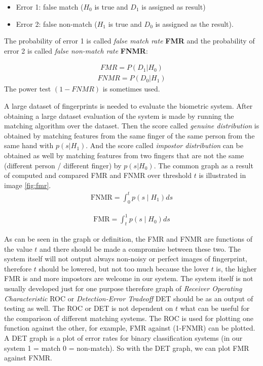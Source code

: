 \begin{itemize}[label={}]
    \item Error 1: false match ($H_0$ is true and $D_1$ is assigned as result)
    \item Error 2: false non-match ($H_1$ is true and $D_0$ is assigned as the result).
\end{itemize}

The probability of error 1 is called \emph{false match rate} \textbf{FMR} and the probability  of error 2 is called \emph{false non-match rate} \textbf{FNMR}:\cite{maltoni2009handbook}

\begin{align}
    FMR = P(D_1 | H_0 )
\end{align}
\begin{align}
    FNMR = P(D_0 | H_1 )
\end{align}
The power test $(1 - FNMR)$ is sometimes used.\cite{maltoni2009handbook}

A large dataset of fingerprints is needed to evaluate the biometric system. After obtaining a large dataset evaluation of the system is made by running the matching algorithm over the dataset. Then the score called \emph{genuine distribution} is obtained by matching features from the same finger of the same person from the same hand with  $p (s | H_1)$. And the score called \emph{impostor distribution} can be obtained as well by matching features from two fingers that are not the same (different person / different finger) by $p (s | H_0)$. The common graph as a result of computed and compared FMR and FNMR over threshold $t$ is illustrated in image \ref{fig:fmr}. 
\begin{align}
    \mathrm{FNMR}=\int_{0}^{t} p\left(s \mid H_{1}\right) ds
\end{align}
    
\begin{align}
    \mathrm{FMR}=\int_{t}^{1} p\left(s \mid H_{0}\right) ds
\end{align}

As can be seen in the graph or definition, the FMR and FNMR are functions of the value $t$ and there should be made a compromise between these two. The system itself will not output always non-noisy or perfect images of fingerprint, therefore $t$ should be lowered, but not too much because the lover $t$ is, the higher FMR is and more impostors are welcome in our system. The system itself is not usually developed just for one purpose therefore graph of \emph{Receiver Operating Characteristic} ROC or \emph{Detection-Error Tradeoff} DET should be as an output of testing as well. The ROC or DET is not dependent on $t$ what can be useful for the comparison of different matching systems. The ROC is used for plotting one function against the other, for example, FMR against (1-FNMR) can be plotted. A DET graph is a plot of error rates for binary classification systems (in our system 1 = match 0 = non-match). So with the DET graph, we can plot FMR against FNMR. \cite{maltoni2009handbook}

